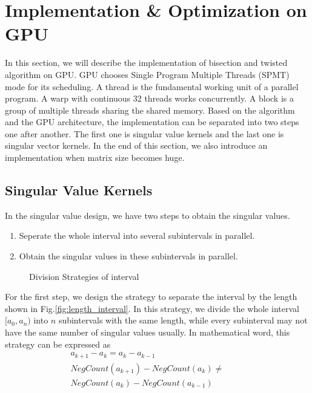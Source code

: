 \section{Implementation \& Optimization on GPU}
In this section, we will describe the implementation of bisection and twisted algorithm on GPU.
GPU chooses Single Program Multiple Threads (SPMT) mode for its scheduling. 
A thread is the fundamental working unit of a parallel program.
A warp with continuous 32 threads works concurrently.
A block is a group of multiple threads sharing the shared memory.
Based on the algorithm and the GPU architecture, the implementation can be separated into two steps one after another.
The first one is singular value kernels and the last one is singular vector kernels.
In the end of this section, we also introduce an implementation when matrix size becomes huge.

\subsection{Singular Value Kernels}
In the singular value design, we have two steps to obtain the singular values.
\begin{enumerate}
\item Seperate the whole interval into several subintervals in parallel.
\item Obtain the singular values in these subintervals in parallel.
\end{enumerate}

\begin{figure}[hbpt]
\centering
  \caption{Division Strategies of interval}
\end{figure}
For the first step, we design the strategy to separate the interval by the length shown in Fig.\ref{fig:length_interval}.
In this strategy, we divide the whole interval $[a_0, a_n)$ into $n$ subintervals with the same length, while every subinterval may not have the same number of singular values usually.
In mathematical word, this strategy can be expressed as%
\begin{eqnarray}
a_{k+1}-a_k = a_{k}-a_{k-1} \hspace{2cm} \\
NegCount(a_{k+1})-NegCount(a_{k}) \ne \hspace{1cm} \nonumber\\
NegCount(a_{k})-NegCount(a_{k-1})
\end{eqnarray}

